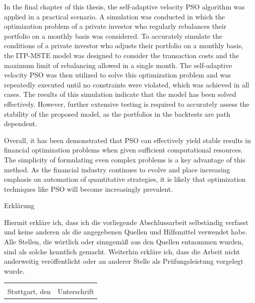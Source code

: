 \documentclass[
  oneside, a4paper, 12pt, openany]{book}
\theoremstyle{definition}
\theoremstyle{definition}
\theoremstyle{definition}
\theoremstyle{definition}
\theoremstyle{remark}
\begin{document}
In the final chapter of this thesis, the self-adaptive velocity PSO algorithm was applied in a practical scenario. A simulation was conducted in which the optimization problem of a private investor who regularly rebalances their portfolio on a monthly basis was considered. To accurately simulate the conditions of a private investor who adjusts their portfolio on a monthly basis, the ITP-MSTE model was designed to consider the transaction costs and the maximum limit of rebalancing allowed in a single month. The self-adaptive velocity PSO was then utilized to solve this optimization problem and was repeatedly executed until no constraints were violated, which was achieved in all cases. The results of this simulation indicate that the model has been solved effectively. However, further extensive testing is required to accurately assess the stability of the proposed model, as the portfolios in the backtests are path dependent.

Overall, it has been demonstrated that PSO can effectively yield stable results in financial optimization problems when given sufficient computational resources. The simplicity of formulating even complex problems is a key advantage of this method. As the financial industry continues to evolve and place increasing emphasis on automation of quantitative strategies, it is likely that optimization techniques like PSO will become increasingly prevalent.

  

\newpage
\thispagestyle{empty}
{\Large Erklärung}

\vspace{0.5cm}
Hiermit erkläre ich, dass ich die vorliegende Abschlussarbeit selbständig verfasst und
keine anderen als die angegebenen Quellen und Hilfsmittel verwendet habe. Alle
Stellen, die wörtlich oder sinngemäß aus den Quellen entnommen wurden, sind als
solche kenntlich gemacht. Weiterhin erkläre ich, dass die Arbeit nicht anderweitig
veröffentlicht oder an anderer Stelle als Prüfungsleistung vorgelegt wurde.
\newline
\newline

\noindent
\begin{tabular}{@{}p{2.5in}p{2.5in}@{}}
  \hrulefill & \hrulefill \\
  Stuttgart, den & Unterschrift \\
\end{tabular}
\end{document}
